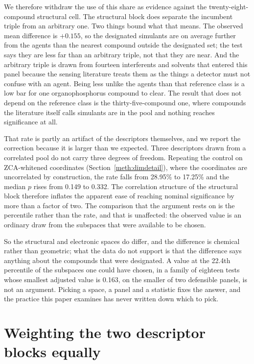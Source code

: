 \documentclass[journal=jacsat,manuscript=suppinfo,margin=1in]{achemso}
\begin{document}
We therefore withdraw the use of this share as evidence against the
twenty-eight-compound structural cell. The structural block does separate the
incumbent triple from an arbitrary one. Two things bound what that means. The
observed mean difference is $+0.155$, so the designated simulants are on average
further from the agents than the nearest compound outside the designated set;
the test says they are less far than an arbitrary triple, not that they are
near. And the arbitrary triple is drawn from fourteen interferents and solvents
that entered this panel because the sensing literature treats them as the things
a detector must not confuse with an agent. Being less unlike the agents than
that reference class is a low bar for one organophosphorus compound to clear.
The result that does not depend on the reference class is the
thirty-five-compound one, where compounds the literature itself calls simulants
are in the pool and nothing reaches significance at all.

That rate is partly an artifact of the descriptors themselves, and we report the
correction because it is larger than we expected. Three descriptors drawn from a
correlated pool do not carry three degrees of freedom. Repeating the control on
ZCA-whitened coordinates (Section~\ref{meth:dimdetail}), where the coordinates are
uncorrelated by construction, the rate falls from 28.95\% to 17.25\% and the
median $p$ rises from 0.149 to 0.332. The correlation structure of the
structural block therefore inflates the apparent ease of reaching nominal
significance by more than a factor of two. The comparison that the argument
rests on is the percentile rather than the rate, and that is unaffected: the
observed value is an ordinary draw from the subspaces that were available to be
chosen.

So the structural and electronic spaces do differ, and the difference is
chemical rather than geometric; what the data do not support is that the
difference says anything about the compounds that were designated. A value at
the 22.4th percentile of the subspaces one could have chosen, in a family of
eighteen tests whose smallest adjusted value is 0.163, on the smaller of two
defensible panels, is not an argument. Picking a space, a panel and a statistic
fixes the answer, and the practice this paper examines has never written down
which to pick.

\section{Weighting the two descriptor blocks equally}
\label{res:blockbalance}
\end{document}
